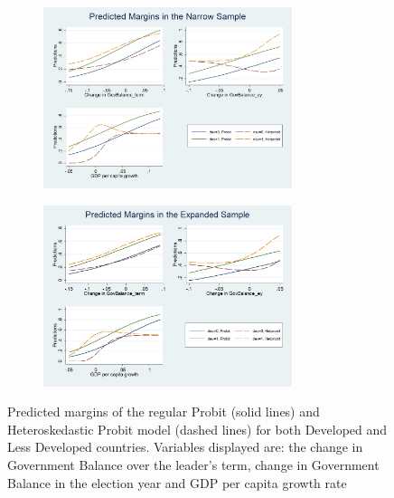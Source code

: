 
\begin{figure}[H]
    \centering
    \label{figure:margins}
    \begin{subfigure}[H]{1\textwidth}
    \centering
    \includegraphics[width=0.8\textwidth]{Predicted_Narrow.png}
    \end{subfigure}
    \begin{subfigure}[H]{1\textwidth}
    \centering
    \includegraphics[width=0.8\textwidth]{Predicted_Expanded.png}
    \end{subfigure}
    \caption{\small{Predicted margins of the regular Probit (solid lines) and Heteroskedastic Probit model (dashed lines) for both Developed and Less Developed countries. Variables displayed are: the change in Government Balance over the leader's term, change in Government Balance in the election year and GDP per capita growth rate}}
    \label{Predicted_Narrow}
\end{figure}
